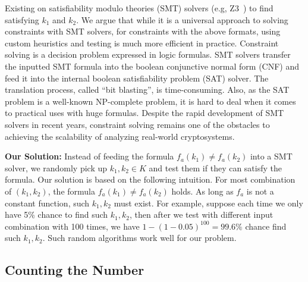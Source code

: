 Existing  on satisfiability modulo theories (SMT) solvers 
(e.g, Z3~\cite{DeMoura:2008:ZES:1792734.1792766}) to find satisfying 
$k_1$ and $k_2$.
We argue that while it is a universal approach to solving constraints 
with SMT solvers, for constraints with the above formats, using custom 
heuristics and testing is much more efficient in practice. Constraint 
solving is a decision problem expressed in logic formulas. SMT solvers 
transfer the inputted SMT formula into the boolean conjunctive normal 
form (CNF) and feed it into the internal boolean satisfiability 
problem (SAT) solver. The translation process, called ``bit blasting'', 
is time-consuming. Also, as the SAT problem is a well-known NP-complete 
problem, it is hard to deal when it comes to
practical uses with huge formulas. Despite the rapid development 
of SMT solvers in recent years, constraint solving remains one of 
the obstacles to achieving the scalability of analyzing real-world cryptosystems.

\textbf{Our Solution:}
Instead of feeding the formula $f_a(k_1) \neq f_a(k_2)$ into a SMT solver, we
randomly pick up $k_1, k_2 \in K$ and test them if they can satisfy the
formula. Our solution is based on the following intuition. For most combination
of $(k_{1}, k_{2} )$, the formula $f_a(k_1) \neq f_a(k_2)$ holds. As long as
$f_a$ is not a constant function, such $k_1, k_2$ must exist. For example,
suppose each time we only have 5\% chance to find such $k_1, k_2$, then after we
test with different input combination with 100 times, we have $1 -
(1-0.05)^{100} = 99.6\%$ chance find such $k_1, k_2$. Such random algorithms
work well for our problem.

\subsection{Counting the Number}
\label{MCreasons}


